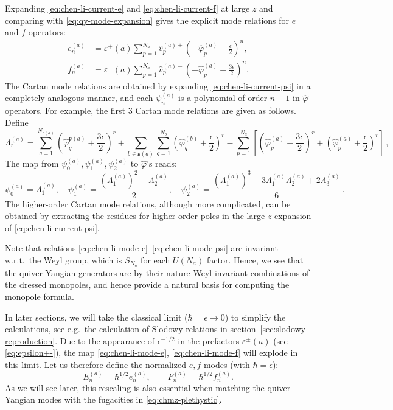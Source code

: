 \documentclass[12pt,a4paper]{article}
\newcommand{\eps}{\epsilon}
\begin{document}
Expanding \eqref{eq:chen-li-current-e} and
\eqref{eq:chen-li-current-f} at large $z$ and comparing with
\eqref{eq:qy-mode-expansion} gives the explicit mode relations for $e$ and $f$ operators:
\begin{align}
 e_n^{(a)}
 &=\varepsilon^+(a)\sum_{p=1}^{N_a}
 \hat v_p^{(a)+}
 \left(-\hat\varphi_p^{(a)}-\frac{\epsilon}{2}\right)^n,
 \label{eq:chen-li-mode-e}\\
 f_n^{(a)}
 &=\varepsilon^-(a)\sum_{p=1}^{N_a}
 \hat v_p^{(a)-}
 \left(-\hat\varphi_p^{(a)}-\frac{3\epsilon}{2}\right)^n.
 \label{eq:chen-li-mode-f}
\end{align}
The Cartan mode relations are obtained by expanding
\eqref{eq:chen-li-current-psi} in a completely analogous manner, and each $\psi^{(a)}_n$ is a polynomial of order $n+1$ in $\hat{\varphi}$ operators. 
For example, the first 3 Cartan mode relations are given as follows. Define 
{\small
\begin{equation}
    \Lambda^{(a)}_r=\sum_{q=1}^{N_{\mathfrak p(a)}}\left(\hat\varphi^{\mathfrak p(a)}_q+\frac{3\eps}{2}\right)^r+\sum_{b\in \mathfrak s(a)}\sum_{q=1}^{N_b}\left(\hat\varphi^{(b)}_q+\frac{\eps}{2}\right)^r-\sum_{p=1}^{N_a}\left[\left(\hat\varphi^{(a)}_p+\frac{3\eps}{2}\right)^r+\left(\hat\varphi^{(a)}_p+\frac{\eps}{2}\right)^r\right]\,,
\end{equation} }
The map from $\psi^{(a)}_0,\psi^{(a)}_1,\psi^{(a)}_2$ to $\hat{\varphi}$'s reads:
\begin{equation}\label{eq:chen-li-mode-psi}
    \psi^{(a)}_0=\Lambda^{(a)}_1,\quad \psi^{(a)}_1=\frac{(\Lambda^{(a)}_1)^2-\Lambda^{(a)}_2}{2},\quad \psi^{(a)}_2=\frac{(\Lambda^{(a)}_1)^3-3\Lambda^{(a)}_1 \Lambda^{(a)}_2 +2 \Lambda^{(a)}_3}{6}\,.
\end{equation}
The higher-order Cartan mode relations, although more complicated, can be obtained by extracting the residues for higher-order poles in the large $z$ expansion of \eqref{eq:chen-li-current-psi}.

Note that relations 
\eqref{eq:chen-li-mode-e}--\eqref{eq:chen-li-mode-psi} are invariant w.r.t.\ the Weyl group, which is $S_{N_a}$ for each $U(N_a)$ factor. Hence, we see that the quiver Yangian generators are by their nature Weyl-invariant combinations of the dressed monopoles, and hence provide a natural basis for computing the monopole formula.

\medskip

In later sections, we will take the classical limit ($\hbar=\eps\to 0$) to simplify the calculations, see e.g.\ the calculation of Slodowy relations in section~\ref{sec:slodowy-reproduction}. 
Due to the appearance of $\epsilon^{-1/2}$ in the prefactors $\varepsilon^\pm(a)$ (see \eqref{eq:epsilon+-}), the map \eqref{eq:chen-li-mode-e}, \eqref{eq:chen-li-mode-f} will explode in this limit. Let us therefore define
the normalized $e,f$ modes (with $\hbar=\eps$):
\begin{equation}
 E_n^{(a)}=\hbar^{1/2}e_n^{(a)},
 \qquad
 F_n^{(a)}=\hbar^{1/2}f_n^{(a)}.
 \label{eq:normalized-modes}
\end{equation}
As we will see later, this rescaling is also essential when matching the quiver Yangian modes with the fugacities in
\eqref{eq:chmz-plethystic}.
\end{document}
